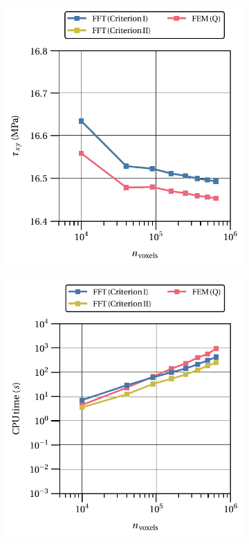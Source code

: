 \begin{figure}[hbt]
  \centering
	\begin{subfigure}[b]{0.49\textwidth}
    \centering
    \includegraphics[width=\textwidth]{figures/hencky_2D_shear_homo_stress_12_vs_n_voxels}
    \caption{}
    \label{subfig:hencky_2D_shear_homo_stress_12_vs_n_voxels}
  \end{subfigure}
  \begin{subfigure}[b]{0.49\textwidth}
    \centering
    \includegraphics[width=\textwidth]{figures/hencky_2D_shear_cpu_time_vs_n_voxels}

\end{subfigure}
\end{figure}
